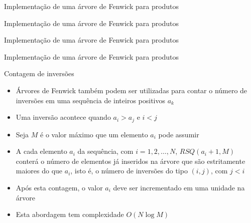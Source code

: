 \begin{frame}[fragile]{Implementação de uma árvore de Fenwick para produtos}
\end{frame}

\begin{frame}[fragile]{Implementação de uma árvore de Fenwick para produtos}
\end{frame}

\begin{frame}[fragile]{Implementação de uma árvore de Fenwick para produtos}
\end{frame}

\begin{frame}[fragile]{Implementação de uma árvore de Fenwick para produtos}
\end{frame}

\begin{frame}[fragile]{Contagem de inversões}

    \begin{itemize}
        \item Árvores de Fenwick também podem ser utilizadas para contar o número de inversões
            em uma sequência de inteiros positivos $a_k$

        \item Uma inversão acontece quando $a_i > a_j$ e $i < j$

        \item Seja $M$ é o valor máximo que um elemento $a_i$ pode assumir

        \item A cada elemento $a_i$ da sequência, com $i = 1, 2, \ldots, N$, $RSQ(a_i + 1, M)$ 
            conterá o número de elementos
            já inseridos na árvore que são estritamente maiores do que $a_i$, isto é, o número
            de inversões do tipo $(i, j)$, com $j < i$

        \item Após esta contagem, o valor $a_i$ deve ser incrementado em uma unidade na árvore

        \item Esta abordagem tem complexidade $O(N\log M)$
    \end{itemize}

\end{frame}

